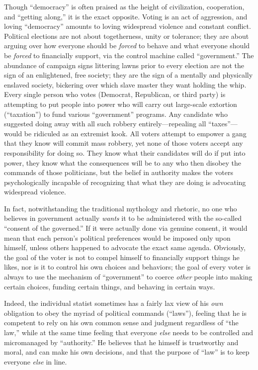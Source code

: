 \documentclass{book}
\begin{document}
Though \enquote{democracy} is often praised as the height of civilization, cooperation, and \enquote{getting along,} it is the exact opposite. Voting is an act of aggression, and loving \enquote{democracy} amounts to loving widespread violence and constant conflict. Political elections are not about togetherness, unity or tolerance; they are about arguing over how everyone should be \emph{forced} to behave and what everyone should be \emph{forced} to financially support, via the control machine called \enquote{government.} The abundance of campaign signs littering lawns prior to every election are not the sign of an enlightened, free society; they are the sign of a mentally and physically enslaved society, bickering over which slave master they want holding the whip. Every single person who votes (Democrat, Republican, or third party) is attempting to put people into power who will carry out large-scale extortion (\enquote{taxation}) to fund various \enquote{government} programs. Any candidate who suggested doing away with all such robbery entirely---repealing all \enquote{taxes}---would be ridiculed as an extremist kook. All voters attempt to empower a gang that they know will commit mass robbery, yet none of those voters accept any responsibility for doing so. They know what their candidates will do if put into power, they know what the consequences will be to any who then disobey the commands of those politicians, but the belief in authority makes the voters psychologically incapable of recognizing that what they are doing is advocating widespread violence.

In fact, notwithstanding the traditional mythology and rhetoric, no one who believes in government actually \emph{wants} it to be administered with the so-called \enquote{consent of the governed.} If it were actually done via genuine consent, it would mean that each person's political preferences would be imposed only upon himself, unless others happened to advocate the exact same agenda. Obviously, the goal of the voter is not to compel himself to financially support things he likes, nor is it to control his own choices and behaviors; the goal of every voter is always to use the mechanism of \enquote{government} to coerce \emph{other} people into making certain choices, funding certain things, and behaving in certain ways.

Indeed, the individual statist sometimes has a fairly lax view of his \emph{own} obligation to obey the myriad of political commands (\enquote{laws}), feeling that he is competent to rely on his own common sense and judgment regardless of \enquote{the law,} while at the same time feeling that everyone \emph{else} needs to be controlled and micromanaged by \enquote{authority.} He believes that he himself is trustworthy and moral, and can make his own decisions, and that the purpose of \enquote{law} is to keep everyone \emph{else} in line.
\end{document}
